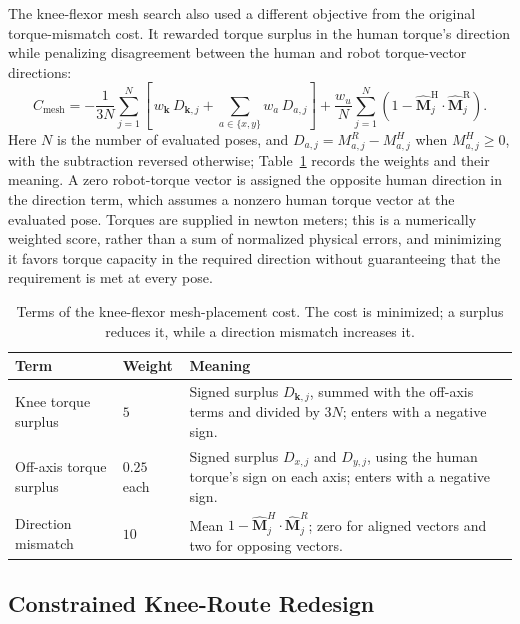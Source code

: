 The knee-flexor mesh search also used a different objective from the original torque-mismatch cost. It rewarded torque surplus in the human torque's direction while penalizing disagreement between the human and robot torque-vector directions:
\begin{equation}
C_{\mathrm{mesh}} = -\frac{1}{3N}\sum_{j=1}^{N}\left[\,w_{\mathbf{k}}\,D_{\mathbf{k},j} + \sum_{a\in\{x,y\}} w_{a}\,D_{a,j}\right] + \frac{w_{u}}{N}\sum_{j=1}^{N}\left(1 - \hat{\mathbf{M}}^{\mathrm{H}}_{j}\cdot\hat{\mathbf{M}}^{\mathrm{R}}_{j}\right).
\label{eq:mesh_reward}
\end{equation}
Here $N$ is the number of evaluated poses, and $D_{a,j}=M^R_{a,j}-M^H_{a,j}$ when $M^H_{a,j}\geq0$, with the subtraction reversed otherwise; Table~\ref{tab:mesh_original_weights} records the weights and their meaning. A zero robot-torque vector is assigned the opposite human direction in the direction term, which assumes a nonzero human torque vector at the evaluated pose. Torques are supplied in newton meters; this is a numerically weighted score, rather than a sum of normalized physical errors, and minimizing it favors torque capacity in the required direction without guaranteeing that the requirement is met at every pose.




\begin{table}[htbp]
\caption{Terms of the knee-flexor mesh-placement cost. The cost is minimized; a surplus reduces it, while a direction mismatch increases it.}
\label{tab:mesh_original_weights}
\begin{tabularx}{\textwidth}{@{}p{}p{}X@{}}
\toprule
\textbf{Term} & \textbf{Weight} & \textbf{Meaning} \\
\midrule
Knee torque surplus & $5$ & Signed surplus $D_{\mathbf{k},j}$, summed with the off-axis terms and divided by $3N$; enters with a negative sign. \\
Off-axis torque surplus & $0.25$ each & Signed surplus $D_{x,j}$ and $D_{y,j}$, using the human torque's sign on each axis; enters with a negative sign. \\
Direction mismatch & $10$ & Mean $1-\hat{\mathbf{M}}^H_j\cdot\hat{\mathbf{M}}^R_j$; zero for aligned vectors and two for opposing vectors. \\
\bottomrule
\end{tabularx}
\end{table}

\subsection{Constrained Knee-Route Redesign}\label{sec:constrained_redesign}

